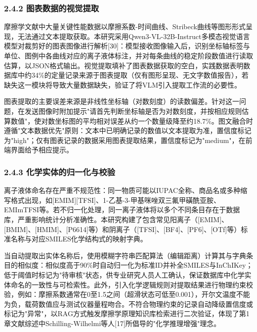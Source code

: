 \hypertarget{ux56feux8868ux6570ux636eux7684ux89c6ux89c9ux63d0ux53d6}{%
\subsubsection{2.4.2 图表数据的视觉提取}\label{ux56feux8868ux6570ux636eux7684ux89c6ux89c9ux63d0ux53d6}}

摩擦学文献中大量关键性能数据以摩擦系数-时间曲线、Stribeck曲线等图形形式呈现，无法通过文本提取获取。本研究采用Qwen3-VL-32B-Instruct多模态视觉语言模型对裁剪好的图表图像进行解析{[}30{]}：模型接收图像输入后，识别坐标轴标签与单位、图例中各曲线对应的离子液体标注，并对每条曲线的稳定阶段数值进行读取估算，以JSON格式输出。视觉提取填补了图表数据获取的空白，实践数据表明数据库中约34\%的定量记录来源于图表提取（仅有图形呈现、无文字数值报告），若缺失这一模块将导致大量数据缺失，验证了将VLM引入提取工作流的必要性。

图表提取的主要误差来源是非线性坐标轴（对数刻度）的读数偏差。针对这一问题，在发送图像时附加提示"请首先判断坐标轴是否为对数刻度，并按相应规则估算数值"，使对数坐标图的平均相对误差从约一个数量级降至约18.7\%。图文融合时遵循"文本数据优先"原则：文本中已明确记录的数值以文本提取为准，置信度标记为"high"；仅有图表记录的数据采用图表提取结果，置信度标记为"medium"，在前端界面给予相应提示。

\hypertarget{ux5316ux5b66ux5b9eux4f53ux7684ux5f52ux4e00ux5316ux4e0eux6821ux9a8c}{%
\subsubsection{2.4.3 化学实体的归一化与校验}\label{ux5316ux5b66ux5b9eux4f53ux7684ux5f52ux4e00ux5316ux4e0eux6821ux9a8c}}

离子液体命名存在严重不规范性：同一物质可能以IUPAC全称、商品名或多种缩写格式出现，如{[}EMIM{]}{[}TFSI{]}、1-乙基-3-甲基咪唑双三氟甲磺酰亚胺、EMImTFSI等。若不归一化处理，同一离子液体将以多个不同条目存在于数据库，严重影响统计分析准确性。本研究构建了包含常见阳离子（{[}EMIM{]}、{[}BMIM{]}、{[}HMIM{]}、{[}P6614{]}等）和阴离子（{[}TFSI{]}、{[}BF4{]}、{[}PF6{]}、{[}OTf{]}等）标准名称与对应SMILES化学结构式的映射字典。

当自动提取出实体名称后，使用模糊字符串匹配算法（编辑距离）计算其与字典条目的相似度：相似度高于90\%时自动归一化为标准ID并补全SMILES与InChIKey；低于阈值时标记为"待审核"状态，供专业研究人员人工确认，保证数据库中化学实体命名的一致性与可检索性。此外，引入化学逻辑规则对提取结果进行物理约束校验，例如：摩擦系数通常在0至1.5之间（超滑状态可低至0.001），开尔文温度不能为负，载荷数值应与测试仪器量程吻合。不符合物理约束的记录自动降级置信度或标记为"异常"，以RAG方式触发摩擦学原理知识库检索进行二次验证，体现了第1章文献综述中Schilling-Wilhelmi等人{[}17{]}所倡导的"化学推理增强"理念。

